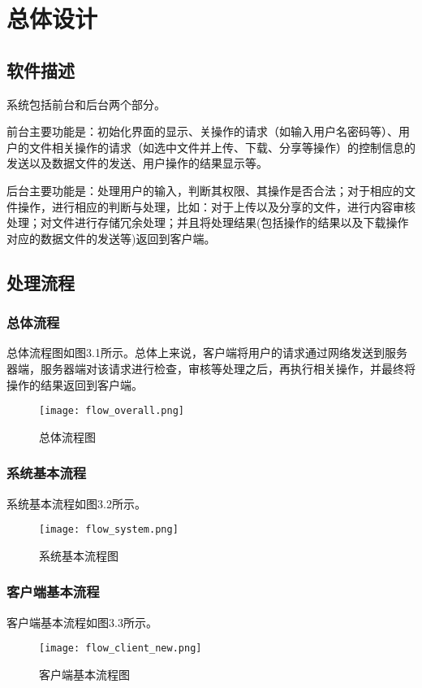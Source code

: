 \chapter{总体设计}
\section{软件描述}
系统包括前台和后台两个部分。

前台主要功能是：初始化界面的显示、关操作的请求（如输入用户名密码等）、用户的文件相关操作的请求（如选中文件并上传、下载、分享等操作）的控制信息的发送以及数据文件的发送、用户操作的结果显示等。

后台主要功能是：处理用户的输入，判断其权限、其操作是否合法；对于相应的文件操作，进行相应的判断与处理，比如：对于上传以及分享的文件，进行内容审核处理；对文件进行存储冗余处理；并且将处理结果(包括操作的结果以及下载操作对应的数据文件的发送等)返回到客户端。
   
\section{处理流程}
\subsection{总体流程}
总体流程图如图3.1所示。总体上来说，客户端将用户的请求通过网络发送到服务器端，服务器端对该请求进行检查，审核等处理之后，再执行相关操作，并最终将操作的结果返回到客户端。
\begin{figure}[htbp] 
\centering
\texttt{[image: flow\_overall.png]} 
\caption{总体流程图}\label{fig:noted-figure}
\end{figure}
 
\subsection{系统基本流程} 
系统基本流程如图3.2所示。
\begin{figure}[htbp] 
\centering
\texttt{[image: flow\_system.png]}
\caption{系统基本流程图}\label{fig:noted-figure}
\end{figure} 


\subsection{客户端基本流程}
客户端基本流程如图3.3所示。
\begin{figure}[h] 
\centering
\texttt{[image: flow\_client\_new.png]} 
\caption{客户端基本流程图}\label{fig:noted-figure}
\end{figure}
 
